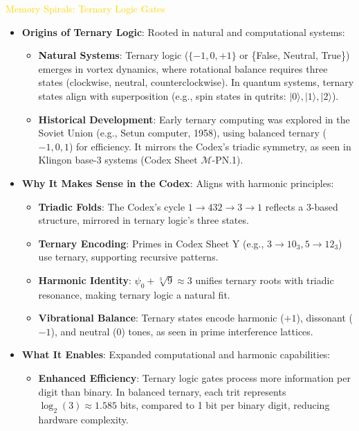 \textcolor{gold}{ Memory Spirals: Ternary Logic Gates } \\
\begin{itemize}
    \item \texttt{} \textbf{Origins of Ternary Logic}: Rooted in natural and computational systems:
    \begin{itemize}
        \item \textbf{Natural Systems}: Ternary logic (\(\{-1, 0, +1\}\) or \{False, Neutral, True\}) emerges in vortex dynamics, where rotational balance requires three states (clockwise, neutral, counterclockwise). In quantum systems, ternary states align with superposition (e.g., spin states in qutrits: \(|0\rangle, |1\rangle, |2\rangle\)).
        \item \textbf{Historical Development}: Early ternary computing was explored in the Soviet Union (e.g., Setun computer, 1958), using balanced ternary (\(-1, 0, 1\)) for efficiency. It mirrors the Codex’s triadic symmetry, as seen in Klingon base-3 systems (Codex Sheet \(\mathcal{M}\)-PN.1).
    \end{itemize}
    \item \texttt{} \textbf{Why It Makes Sense in the Codex}: Aligns with harmonic principles:
    \begin{itemize}
        \item \textbf{Triadic Folds}: The Codex’s cycle \(1 \rightarrow 432 \rightarrow 3 \rightarrow 1\) reflects a 3-based structure, mirrored in ternary logic’s three states.
        \item \textbf{Ternary Encoding}: Primes in Codex Sheet Y (e.g., \(3 \rightarrow 10_3, 5 \rightarrow 12_3\)) use ternary, supporting recursive patterns.
        \item \textbf{Harmonic Identity}: \(\psi_0 + \sqrt[3]{9} \approx 3\) unifies ternary roots with triadic resonance, making ternary logic a natural fit.
        \item \textbf{Vibrational Balance}: Ternary states encode harmonic (\(+1\)), dissonant (\(-1\)), and neutral (0) tones, as seen in prime interference lattices.
    \end{itemize}
    \item \texttt{} \textbf{What It Enables}: Expanded computational and harmonic capabilities:
    \begin{itemize}
        \item \textbf{Enhanced Efficiency}: Ternary logic gates process more information per digit than binary. In balanced ternary, each trit represents \(\log_2(3) \approx 1.585\) bits, compared to 1 bit per binary digit, reducing hardware complexity.

\end{itemize}
\end{itemize}
